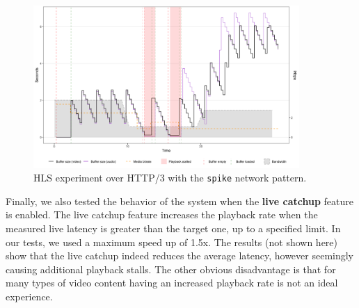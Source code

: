 \begin{figure}[h]
    \centering
    \includegraphics[width=0.9\textwidth]{res/eval_abr_spike_hls.png}
    \caption{HLS experiment over HTTP/3 with the \texttt{spike} network pattern.}
    \label{fig:eval_abr_hls}
\end{figure}

Finally, we also tested the behavior of the system when the \textbf{live catchup} feature is enabled. The live catchup feature increases the playback rate when the measured live latency is greater than the target one, up to a specified limit. In our tests, we used a maximum speed up of 1.5x. The results (not shown here) show that the live catchup indeed reduces the average latency, however seemingly causing additional playback stalls. The other obvious disadvantage is that for many types of video content having an increased playback rate is not an ideal experience.


